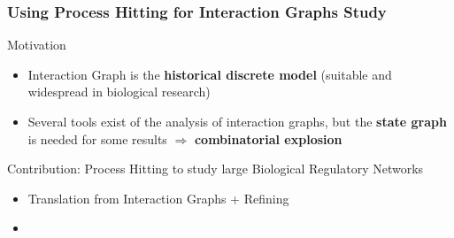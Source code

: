 \begin{comment}
\only<7->{
\THit{b_0}{ulhit}{ab_1}{.west}{ab_0}
\THit{b_0}{ulhit}{ab_3}{.west}{ab_2}
\path[bounce,bend right,pulhit]
\TBounce{ab_1}{bulhit}{ab_0}{.north west}
\TBounce{ab_3}{bulhit}{ab_2}{.north west};
\THit{ab_3}{}{z_0}{.west}{z_1}
\path[bounce,bend left]
\TBounce{z_0}{}{z_1}{.south west};
}

\end{tikzpicture}
}
\end{center}

\pause[8]
\begin{fleches}
\item Introduces a temporal shift (over-approximation)
\pause[9]
\item Solution = Prioritized actions
\end{fleches}

\end{frame}
\end{comment}



\begin{frame}
  \frametitle{Using Process Hitting for Interaction Graphs Study}

\begin{block}{Motivation}
\begin{itemize}
  \item Interaction Graph is the \textbf{historical discrete model} (suitable and widespread in biological research) 
  \item Several tools exist of the analysis of interaction graphs, but the \textbf{state graph} is needed for some results $\Rightarrow$ \textbf{combinatorial explosion}
\end{itemize}  
\end{block}

\begin{block}{Contribution: Process Hitting to study large Biological Regulatory Networks}
\begin{itemize}
  \item Translation from Interaction Graphs + Refining
  \item {}
\end{itemize}
\end{block}

\end{frame}



